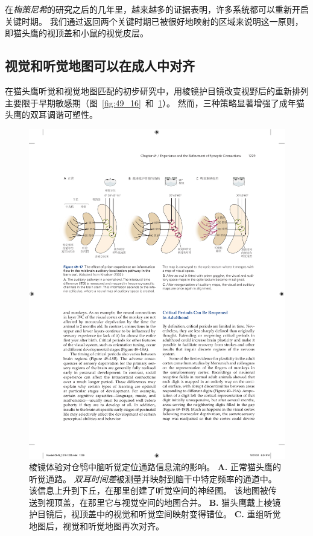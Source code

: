 在\textit{梅策尼希}的研究之后的几年里，越来越多的证据表明，许多系统都可以重新开启关键时期。
我们通过返回两个关键时期已被很好地映射的区域来说明这一原则，即猫头鹰的视顶盖和小鼠的视觉皮层。



\subsection{视觉和听觉地图可以在成人中对齐}

在猫头鹰听觉和视觉地图匹配的初步研究中，用棱镜护目镜改变视野后的重新排列主要限于早期敏感期（图~\ref{fig:49_16}~和~\ref{fig:49_17}）。
然而，三种策略显著增强了成年猫头鹰的双耳调谐可塑性。


\begin{figure}[htbp]
	\centering
	\includegraphics[width=1.0\linewidth]{chap49/fig_49_17}
	\caption{棱镜体验对仓鸮中脑听觉定位通路信息流的影响\cite{knudsen2002instructed}。
		\textbf{A.} 正常猫头鹰的听觉通路。
		\textit{双耳时间差}被测量并映射到脑干中特定频率的通道中。
		该信息上升到下丘，在那里创建了听觉空间的神经图。
		该地图被传送到视顶盖，在那里它与视觉空间的地图合并。
		\textbf{B.} 猫头鹰戴上棱镜护目镜后，视顶盖中的视觉和听觉空间映射变得错位。
		\textbf{C.} 重组听觉地图后，视觉和听觉地图再次对齐。}
	\label{fig:49_17}
\end{figure}


